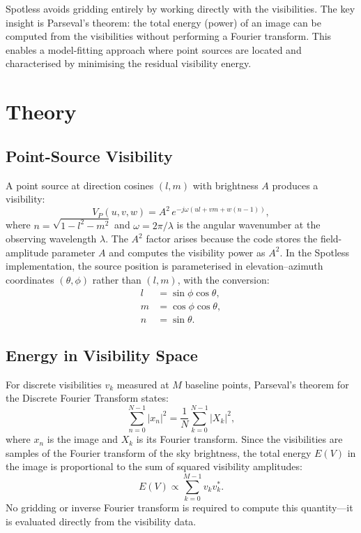 \documentclass[a4paper,11pt]{article}
\begin{document}
Spotless avoids gridding entirely by working directly with the
visibilities. The key insight is Parseval's theorem: the total energy
(power) of an image can be computed from the visibilities without
performing a Fourier transform. This enables a model-fitting approach
where point sources are located and characterised by minimising the
residual visibility energy.

\section{Theory}

\subsection{Point-Source Visibility}

A point source at direction cosines $(l, m)$ with brightness $A$
produces a visibility:
%
\begin{equation}
	V_P(u, v, w) = A^2 \, e^{-j\omega (ul + vm + w(n-1))},
	\label{eq:ptvis}
\end{equation}
%
where $n = \sqrt{1 - l^2 - m^2}$ and $\omega = 2\pi/\lambda$ is the
angular wavenumber at the observing wavelength $\lambda$. The $A^2$
factor arises because the code stores the field-amplitude parameter
$A$ and computes the visibility power as $A^2$. In the Spotless
implementation, the source position is parameterised in
elevation--azimuth coordinates
$(\theta, \phi)$ rather than $(l, m)$, with the conversion:
%
\begin{align}
	l & = \sin\phi \cos\theta, \\
	m & = \cos\phi \cos\theta, \\
	n & = \sin\theta.
	\label{eq:lmn}
\end{align}

\subsection{Energy in Visibility Space}

For discrete visibilities $v_k$ measured at $M$ baseline points,
Parseval's theorem for the Discrete Fourier Transform states:
%
\begin{equation}
	\sum_{n=0}^{N-1} |x_n|^2 = \frac{1}{N} \sum_{k=0}^{N-1} |X_k|^2,
\end{equation}
%
where $x_n$ is the image and $X_k$ is its Fourier transform. Since the
visibilities are samples of the Fourier transform of the sky brightness,
the total energy $E(V)$ in the image is proportional to the sum of
squared visibility amplitudes:
%
\begin{equation}
	E(V) \propto \sum_{k=0}^{M-1} v_k v_k^*.
	\label{eq:energy}
\end{equation}
%
No gridding or inverse Fourier transform is required to compute this
quantity---it is evaluated directly from the visibility data.
\end{document}
